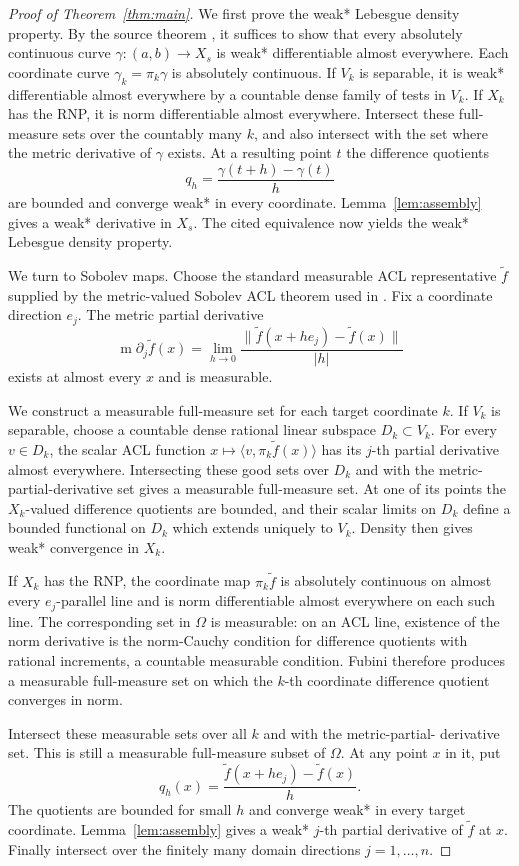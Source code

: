 \documentclass[11pt]{article}
\theoremstyle{remark}
\begin{document}
\begin{proof}[Proof of Theorem~\ref{thm:main}]
We first prove the weak* Lebesgue density property.  By the source theorem
\cite[final theorem of Section 3.5]{CE}, it suffices to show that every
absolutely continuous curve $\gamma:(a,b)\to X_s$ is weak* differentiable
almost everywhere.  Each coordinate curve $\gamma_k=\pi_k\gamma$ is
absolutely continuous.  If $V_k$ is separable, it is weak* differentiable
almost everywhere by a countable dense family of tests in $V_k$.  If $X_k$
has the RNP, it is norm differentiable almost everywhere.  Intersect these
full-measure sets over the countably many $k$, and also intersect with the set
where the metric derivative of $\gamma$ exists.  At a resulting point $t$ the
difference quotients
\[
 q_h=\frac{\gamma(t+h)-\gamma(t)}{h}
\]
are bounded and converge weak* in every coordinate.  Lemma~\ref{lem:assembly}
gives a weak* derivative in $X_s$.  The cited equivalence now yields the weak*
Lebesgue density property.

We turn to Sobolev maps.  Choose the standard measurable ACL representative
$\widetilde f$ supplied by the metric-valued Sobolev ACL theorem used in
\cite[Proposition 2.4]{CE}.  Fix a coordinate direction $e_j$.  The metric
partial derivative
\[
 \operatorname{m}\partial_j\widetilde f(x)
 =\lim_{h\to0}\frac{\|\widetilde f(x+he_j)-\widetilde f(x)\|}{|h|}
\]
exists at almost every $x$ and is measurable.

We construct a measurable full-measure set for each target coordinate $k$.
If $V_k$ is separable, choose a countable dense rational linear subspace
$D_k\subset V_k$.  For
every $v\in D_k$, the scalar ACL function
$x\mapsto\langle v,\pi_k\widetilde f(x)\rangle$ has its $j$-th partial
derivative almost everywhere.  Intersecting these good sets over $D_k$ and
with the metric-partial-derivative set gives a measurable full-measure set.
At one of its points the $X_k$-valued difference quotients are bounded, and
their scalar limits on $D_k$ define a bounded functional on $D_k$ which
extends uniquely to $V_k$.  Density then gives weak* convergence in $X_k$.

If $X_k$ has the RNP, the coordinate map $\pi_k\widetilde f$ is absolutely
continuous on almost every $e_j$-parallel line and is norm differentiable
almost everywhere on each such line.  The corresponding set in $\Omega$ is
measurable: on an ACL line, existence of the norm derivative is the norm-Cauchy
condition for difference quotients with rational increments, a countable
measurable condition.  Fubini therefore produces a measurable full-measure
set on which the $k$-th coordinate difference quotient converges in norm.

Intersect these measurable sets over all $k$ and with the metric-partial-
derivative set.  This is still a measurable full-measure subset of $\Omega$.
At any point $x$ in it, put
\[
 q_h(x)=\frac{\widetilde f(x+he_j)-\widetilde f(x)}{h}.
\]
The quotients are bounded for small $h$ and converge weak* in every target
coordinate.  Lemma~\ref{lem:assembly} gives a weak* $j$-th partial derivative
of $\widetilde f$ at $x$.  Finally intersect over the finitely many domain
directions $j=1,\dots,n$.
\end{proof}
\end{document}
